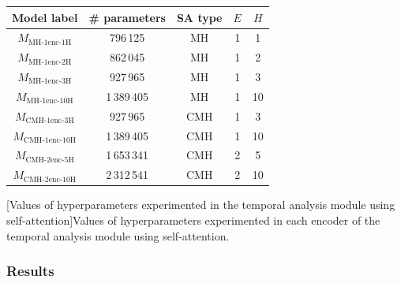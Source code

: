 \begin{table}[t]
\centering
\begin{tabular}{|c|c|c|c|c|}
\hline
\textbf{Model label}                    & \textbf{\# parameters} & \textbf{SA type} & \textbf{$E$} & \textbf{$H$} \\ \hline
$M_{\text{MH-}1\text{enc-}1\text{H}}$   & 796\,125               & MH               & 1            & 1            \\
$M_{\text{MH-}1\text{enc-}2\text{H}}$   & 862\,045               & MH               & 1            & 2            \\
$M_{\text{MH-}1\text{enc-}3\text{H}}$   & 927\,965               & MH               & 1            & 3            \\
$M_{\text{MH-}1\text{enc-}10\text{H}}$  & 1\,389\,405            & MH               & 1            & 10           \\
$M_{\text{CMH-}1\text{enc-}3\text{H}}$  & 927\,965               & CMH              & 1            & 3            \\
$M_{\text{CMH-}1\text{enc-}10\text{H}}$ & 1\,389\,405            & CMH              & 1            & 10           \\
$M_{\text{CMH-}2\text{enc-}5\text{H}}$  & 1\,653\,341            & CMH              & 2            & 5            \\
$M_{\text{CMH-}2\text{enc-}10\text{H}}$ & 2\,312\,541            & CMH              & 2            & 10    \\ \hline      
\end{tabular}
[Values of hyperparameters experimented in the temporal analysis module using self-attention]{Values of hyperparameters experimented in each encoder of the temporal analysis module using self-attention.}
    \label{tab:selfAttentionHyperparameters}
\end{table}

\subsubsection{Results}

